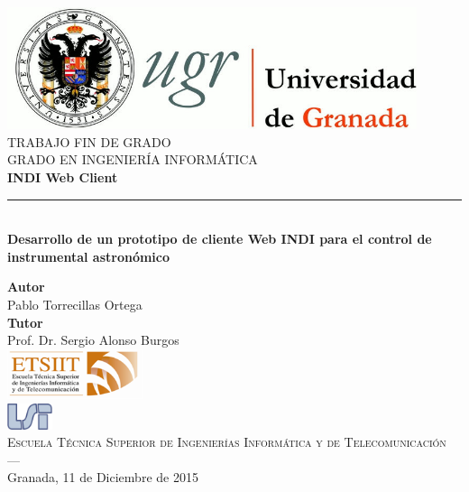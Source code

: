 \begin{titlepage}


\newlength{\centeroffset}
\setlength{\centeroffset}{-0.5\oddsidemargin}
\addtolength{\centeroffset}{0.5\evensidemargin}
\thispagestyle{empty}

\noindent\hspace*{\centeroffset}\begin{minipage}{\textwidth}

\centering
\includegraphics[width=0.9\textwidth]{imagenes/logo_ugr.jpg}\\[1.4cm]

\textsc{ \Large TRABAJO FIN DE GRADO\\[0.2cm]}
\textsc{ GRADO EN INGENIERÍA INFORMÁTICA}\\[1cm]
%
{\Huge\bfseries INDI Web Client\\
}
\noindent\rule[-1ex]{\textwidth}{3pt}\\[3.5ex]
{\large\bfseries Desarrollo de un prototipo de cliente Web INDI para el control de instrumental astronómico}
\end{minipage}

\vspace{2.5cm}
\noindent\hspace*{\centeroffset}\begin{minipage}{\textwidth}
\centering

\textbf{Autor}\\ {Pablo Torrecillas Ortega}\\[2.5ex]
\textbf{Tutor}\\{Prof. Dr. Sergio Alonso Burgos}\\[1,8cm]
\includegraphics[width=0.3\textwidth]{imagenes/etsiit_logo.png}\\[0.1cm]
\includegraphics[width=0.1\textwidth]{imagenes/lsi_logo}\\[0.1cm]
\textsc{Escuela Técnica Superior de Ingenierías Informática y de Telecomunicación}\\
\textsc{---}\\
Granada, 11 de Diciembre de 2015
\end{minipage}
\end{titlepage}
